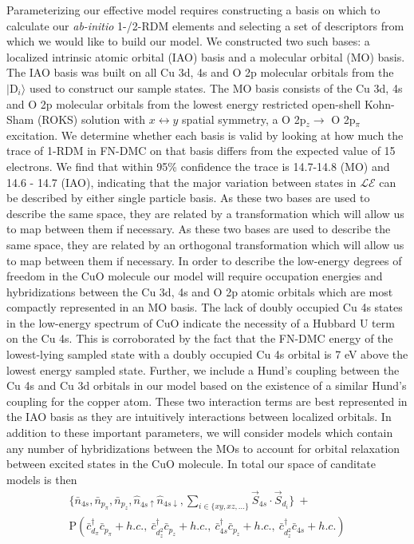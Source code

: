 \documentclass{article}
\begin{document}
Parameterizing our effective model requires constructing a basis on which to calculate our \textit{ab-initio} 1-/2-RDM elements and selecting a set of descriptors from which we would like to build our model.
We constructed two such bases: a localized intrinsic atomic orbital (IAO) basis and a molecular orbital (MO) basis.
The IAO basis was built on all Cu 3d, 4s and O 2p molecular orbitals from the $|\text{D}_i\rangle$ used to construct our sample states.
The MO basis consists of the Cu 3d, 4s and O 2p molecular orbitals from the lowest energy restricted open-shell Kohn-Sham (ROKS) solution with $x \leftrightarrow y$ spatial symmetry, a O 2p$_z \rightarrow$ O 2p$_\pi$ excitation.
We determine whether each basis is valid by looking at how much the trace of 1-RDM in FN-DMC on that basis differs from the expected value of 15 electrons.
We find that within 95\% confidence the trace is 14.7-14.8 (MO) and 14.6 - 14.7 (IAO), indicating that the major variation between states in $\mathcal{LE}$ can be described by either single particle basis.
As these two bases are used to describe the same space, they are related by a  transformation which will allow us to map between them if necessary.
As these two bases are used to describe the same space, they are related by an orthogonal transformation which will allow us to map between them if necessary.
In order to describe the low-energy degrees of freedom in the CuO molecule our model will require occupation energies and hybridizations between the Cu 3d, 4s and O 2p atomic orbitals which are most compactly represented in an MO basis.
The lack of doubly occupied Cu 4s states in the low-energy spectrum of CuO indicate the necessity of a Hubbard U term on the Cu 4s.
This is corroborated by the fact that the FN-DMC energy of the lowest-lying sampled state with a doubly occupied Cu 4s orbital is 7 eV above the lowest energy sampled state.
Further, we include a Hund's coupling between the Cu 4s and Cu 3d orbitals in our model based on the existence of a similar Hund's coupling 
for the copper atom.
These two interaction terms are best represented in the IAO basis as they are intuitively interactions between localized orbitals.
In addition to these important parameters, we will consider models which contain any number of hybridizations between the MOs to account for orbital relaxation between excited states in the CuO molecule.
In total our space of canditate models is then 
\begin{equation}
\begin{split}
\{\bar{n}_{4s}, \bar{n}_{p_\pi}, \bar{n}_{p_z}, \hat{n}_{4s\uparrow} \hat{n}_{4s\downarrow},\sum_{i \in \{xy, xz, ...\}}\vec{S}_{4s}\cdot \vec{S}_{d_i}\} \ + \\
\text{P}(\bar{c}_{d_\pi}^\dagger \bar{c}_{p_\pi} + h.c.,\ \bar{c}_{d_z^2}^\dagger \bar{c}_{p_z} + h.c.,\ \bar{c}_{4s}^\dagger \bar{c}_{p_z} + h.c.,\ \bar{c}_{d_z^2}^\dagger \bar{c}_{4s} + h.c.)
\end{split}
\label{eq:models}
\end{equation}
\end{document}
